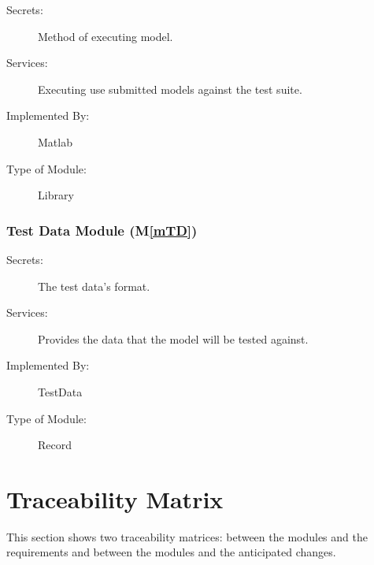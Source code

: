 \documentclass[12pt, titlepage]{article}
\newcommand{\mref}[1]{M\ref{#1}}
\begin{document}
\begin{description}
\item[Secrets:] Method of executing model. 
\item[Services:] Executing use submitted models against the test suite.
\item[Implemented By:] Matlab
\item[Type of Module:] Library
\end{description}

\subsubsection{Test Data Module (\mref{mTD})}

\begin{description}
\item[Secrets:] The test data's format.
\item[Services:] Provides the data that the model will be tested against.
\item[Implemented By:] TestData
\item[Type of Module:] Record
\end{description}

\section{Traceability Matrix} \label{SecTM}

This section shows two traceability matrices: between the modules and the
requirements and between the modules and the anticipated changes.
\end{document}
